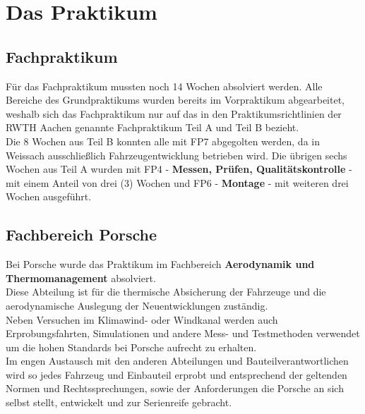\chapter{Das Praktikum}

\section{Fachpraktikum}

Für das Fachpraktikum mussten noch 14 Wochen absolviert werden. Alle Bereiche des Grundpraktikums wurden bereits im Vorpraktikum abgearbeitet, weshalb sich das Fachpraktikum nur auf das in den Praktikumsrichtlinien der RWTH Aachen genannte Fachpraktikum Teil A und Teil B bezieht.\\
Die 8 Wochen aus Teil B konnten alle mit FP7 abgegolten werden, da in Weissach ausschließlich Fahrzeugentwicklung betrieben wird. Die übrigen sechs Wochen aus Teil A wurden mit FP4 - \textbf{Messen, Prüfen, Qualitätskontrolle} - mit einem Anteil von drei (3) Wochen und FP6 - \textbf{Montage} - mit weiteren drei Wochen ausgeführt.\\

\section{Fachbereich Porsche}

Bei Porsche wurde das Praktikum im Fachbereich \textbf{Aerodynamik und Thermomanagement} absolviert. \\
Diese Abteilung ist für die thermische Absicherung der Fahrzeuge und die aerodynamische Auslegung der Neuentwicklungen zuständig.\\
Neben Versuchen im Klimawind- oder Windkanal werden auch Erprobungsfahrten, Simulationen und andere Mess- und Testmethoden verwendet um die hohen Standards bei Porsche aufrecht zu erhalten. \\
Im engen Austausch mit den anderen Abteilungen und Bauteilverantwortlichen wird so jedes Fahrzeug und Einbauteil erprobt und entsprechend der geltenden Normen und Rechtssprechungen, sowie der Anforderungen die Porsche an sich selbst stellt, entwickelt und zur Serienreife gebracht.

